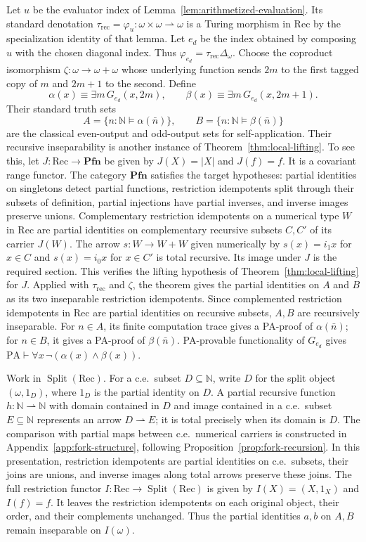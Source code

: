 \documentclass[11pt]{article}
\newcommand{\N}{\mathbb N}
\newcommand{\PA}{\mathrm{PA}}
\newcommand{\Pfn}{\mathbf{Pfn}}
\begin{document}
Let $u$ be the evaluator index of Lemma~\ref{lem:arithmetized-evaluation}.
Its standard denotation
$\tau_{\mathrm{rec}}=\varphi_u:\omega\times\omega\rightharpoonup\omega$
is a Turing morphism in $\mathrm{Rec}$ by the specialization identity
of that lemma. Let $e_d$ be the index obtained by composing $u$
with the chosen diagonal index. Thus
$\varphi_{e_d}=\tau_{\mathrm{rec}}\Delta_\omega$.
Choose the coproduct isomorphism $\zeta:\omega\to\omega+\omega$
whose underlying function sends $2m$ to the first tagged copy of $m$
and $2m+1$ to the second. Define
\[
 \alpha(x)\equiv\exists m\,G_{e_d}(x,2m),\qquad
 \beta(x)\equiv\exists m\,G_{e_d}(x,2m+1).
\]
Their standard truth sets
\[
 A=\{n:\N\models\alpha(\bar n)\},\qquad
 B=\{n:\N\models\beta(\bar n)\}
\]
are the classical even-output and odd-output sets for self-application.
Their recursive inseparability is another instance of
Theorem~\ref{thm:local-lifting}. To see this, let
$J:\mathrm{Rec}\to\Pfn$ be given by $J(X)=|X|$ and $J(f)=f$.
It is a covariant range functor. The category $\Pfn$ satisfies
the target hypotheses: partial identities on singletons detect partial
functions, restriction idempotents split through their subsets of
definition, partial injections have partial inverses, and inverse images
preserve unions. Complementary restriction idempotents on a numerical type $W$
in $\mathrm{Rec}$ are partial identities on complementary recursive
subsets $C,C'$ of its carrier $J(W)$. The arrow $s:W\to W+W$
given numerically by $s(x)=i_1x$ for $x\in C$ and $s(x)=i_0x$
for $x\in C'$ is total recursive. Its image under $J$ is the
required section. This verifies the lifting hypothesis of
Theorem~\ref{thm:local-lifting} for $J$.
Applied with $\tau_{\mathrm{rec}}$ and $\zeta$, the theorem gives
the partial identities on $A$ and $B$ as its two inseparable
restriction idempotents. Since complemented restriction idempotents
in $\mathrm{Rec}$ are partial identities on recursive subsets,
$A,B$ are recursively inseparable.
For $n\in A$, its finite computation trace gives a PA-proof of
$\alpha(\bar n)$; for $n\in B$, it gives a PA-proof of
$\beta(\bar n)$. PA-provable functionality of $G_{e_d}$ gives
$\PA\vdash\forall x\,\neg(\alpha(x)\land\beta(x))$.

Work in $\operatorname{Split}(\mathrm{Rec})$.
For a c.e.\ subset $D\subseteq\N$, write $D$ for the split object
$(\omega,1_D)$, where $1_D$ is the partial identity on $D$.
A partial recursive function $h:\N\rightharpoonup\N$ with domain
contained in $D$ and image contained in a c.e.\ subset $E\subseteq\N$
represents an arrow
$D\rightharpoonup E$; it is total precisely when its domain is $D$.
The comparison with partial maps between c.e.\ numerical carriers
is constructed in Appendix~\ref{app:fork-structure}, following
Proposition~\ref{prop:fork-recursion}.
In this presentation, restriction idempotents are partial identities
on c.e.\ subsets, their joins are unions, and inverse images along
total arrows preserve these joins.
The full restriction functor
$I:\mathrm{Rec}\to\operatorname{Split}(\mathrm{Rec})$ is given by
$I(X)=(X,1_X)$ and $I(f)=f$. It leaves the restriction idempotents
on each original object, their order, and their complements unchanged.
Thus the partial identities $a,b$ on $A,B$ remain inseparable
on $I(\omega)$.
\end{document}
